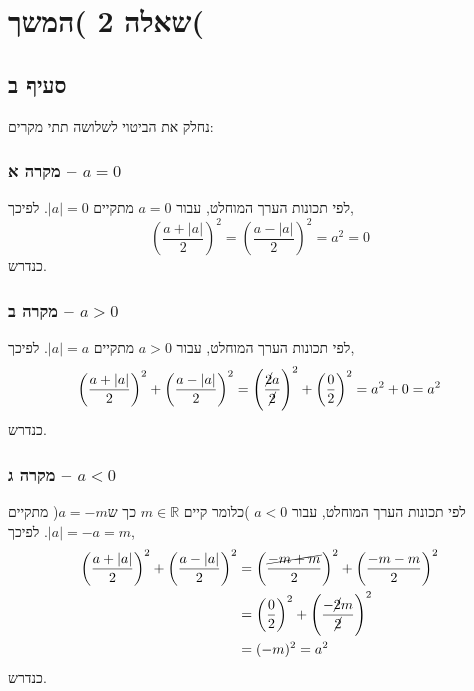 \documentclass[11pt, oneside]{article}
\newcommand{\qed}{\R{$\blacksquare$}}
\newcommand{\br}{\\\\\\\\\\\\\\}
\newcommand{\mR}{\mathbb{R}}
\begin{document}
\setcounter{section}{1}
\section{שאלה 2 )המשך(}
\setcounter{subsection}{1}
\subsection{סעיף ב}
נחלק את הביטוי לשלושה תתי מקרים:
\subsubsection{מקרה א -- $a = 0$}
לפי תכונות הערך המוחלט, עבור $a = 0$ מתקיים $|a| = 0$. לפיכך,
\[
\left(\frac{a + |a|}{2}\right)^2 = \left(\frac{a - |a|}{2}\right)^2 = a^2 = 0
\]
כנדרש.
\subsubsection{מקרה ב -- $a > 0$}
לפי תכונות הערך המוחלט, עבור $a > 0$ מתקיים $|a| = a$. לפיכך,
\[
\left(\frac{a + |a|}{2}\right)^2 + \left(\frac{a - |a|}{2}\right)^2
= \left(\frac{\cancel{2}a}{\cancel{2}}\right)^2 + \left(\frac{0}{2}\right)^2
= a^2 + 0
= a^2
\]
כנדרש.
\subsubsection{מקרה ג -- $a < 0$}
לפי תכונות הערך המוחלט, עבור $a < 0$ )כלומר קיים $m \in \mR$ כך ש$a = -m$( מתקיים $|a| = -a = m$. לפיכך,
\begin{align*}
\left(\frac{a + |a|}{2}\right)^2 + \left(\frac{a - |a|}{2}\right)^2
&= \left(\frac{\cancel{-m + m}}{2}\right)^2 + \left(\frac{-m - m}{2}\right)^2\\
&= \left(\frac{0}{2}\right)^2 + \left(\frac{-\cancel{2}m}{\cancel{2}}\right)^2\\
&= (-m)^2 = a^2\\
\end{align*}
כנדרש.
\br\qed
\end{document}
